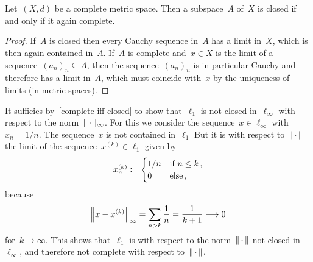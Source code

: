 \section{}





\addtocounter{subsection}{1}





\subsection{}


\begin{lemma}
  \label{complete iff closed}
  Let~$(X,d)$ be a complete metric space.
  Then a subspace~$A$ of~$X$ is closed if and only if it again complete.
\end{lemma}


\begin{proof}
  If~$A$ is closed then every Cauchy sequence in~$A$ has a limit in~$X$, which is then again contained in~$A$.
  If~$A$ is complete and~$x \in X$ is the limit of a sequence~$(a_n)_n \subseteq A$, then the sequence~$(a_n)_n$ is in particular Cauchy and therefore has a limit in~$A$, which must coincide with~$x$ by the uniqueness of limits (in metric spaces).
\end{proof}


It sufficies by~\cref{complete iff closed} to show that~$\ell_1$ is not closed in~$\ell_\infty$ with respect to the norm~$\norm{\,\cdot\,}_\infty$.
For this we consider the sequence~$x \in \ell_\infty$ with~$x_n = 1/n$.
The sequence~$x$ is not contained in~$\ell_1$
But it is with respect to~$\norm{\,\cdot\,}$ the limit of the sequence~$x^{(k)} \in \ell_1$ given by
\[
              x^{(k)}_n
    \defined  \begin{cases}
                1/n & \text{if~$n \leq k$} \,,  \\
                0   & \text{else} \,,
              \end{cases}
\]
because
\[
          \norm*{x - x^{(k)}}_\infty
  =       \sum_{n > k} \frac{1}{n}
  =       \frac{1}{k+1}
  \longto 0
\]
for~$k \to \infty$.
This shows that~$\ell_1$ is with respect to the norm~$\norm{\,\cdot\,}$ not closed in~$\ell_\infty$, and therefore not complete with respect to~$\norm{\,\cdot\,}$.
